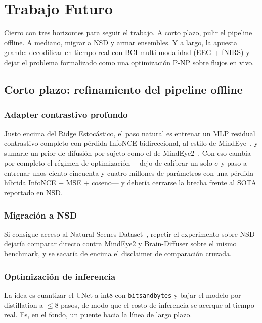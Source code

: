 \chapter{Trabajo Futuro}

Cierro con tres horizontes para seguir el trabajo. A corto plazo, pulir el pipeline offline. A 
mediano, migrar a NSD y armar ensembles. Y a largo, la apuesta grande: decodificar en tiempo 
real con BCI multi-modalidad (EEG + fNIRS) y dejar el problema formalizado como una optimización 
P-NP sobre flujos en vivo.

\section{Corto plazo: refinamiento del pipeline offline}

\subsection{Adapter contrastivo profundo}

Justo encima del Ridge Estocástico, el paso natural es entrenar un MLP residual contrastivo 
completo con pérdida InfoNCE bidireccional, al estilo de MindEye~\cite{scotti2023mindeye}, y 
sumarle un prior de difusión por sujeto como el de MindEye2~\cite{scotti2024mindeye2}. Con eso 
cambia por completo el régimen de optimización ---dejo de calibrar un solo $\sigma$ y paso a 
entrenar unos ciento cincuenta y cuatro millones de parámetros con una pérdida híbrida InfoNCE 
+ MSE + coseno--- y debería cerrarse la brecha frente al SOTA reportado en NSD.

\subsection{Migración a NSD}

Si consigue acceso al Natural Scenes Dataset~\cite{allen2022nsd}, repetir el experimento
sobre NSD dejaría comparar directo contra MindEye2 y Brain-Diffuser sobre
el mismo benchmark, y se sacaría de encima el disclaimer de comparación cruzada.

\subsection{Optimización de inferencia}

La idea es cuantizar el UNet a int8 con \texttt{bitsandbytes} y bajar el modelo por distillation 
a $\leq 8$ pasos, de modo que el costo de inferencia se acerque al tiempo real. Es, en el fondo, 
un puente hacia la línea de largo plazo.

